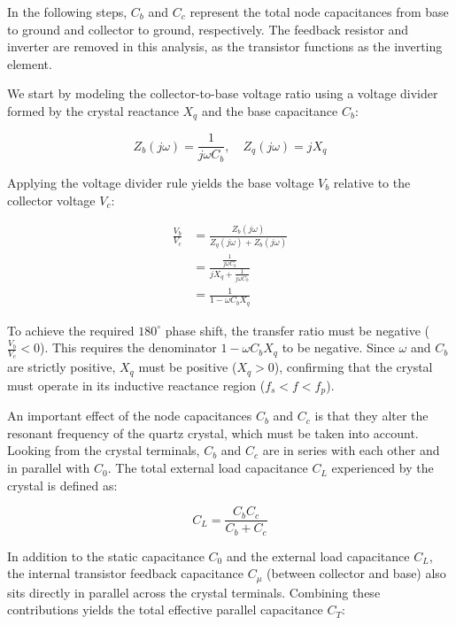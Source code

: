 In the following steps, $C_b$ and $C_c$ represent the total node capacitances from base to ground and collector to ground, respectively. The feedback resistor and inverter are removed in this analysis, as the transistor functions as the inverting element.

We start by modeling the collector-to-base voltage ratio using a voltage divider formed by the crystal reactance $X_q$ and the base capacitance $C_b$:

\begin{equation}
	Z_b(j\omega) = \frac{1}{j\omega C_b}, \quad Z_q(j\omega) = j X_q
\end{equation}

Applying the voltage divider rule yields the base voltage $V_b$ relative to the collector voltage $V_c$:

\begin{align}
	\frac{V_b}{V_c} &= \frac{Z_b(j\omega)}{Z_q(j\omega) + Z_b(j\omega)} \nonumber \\
	&= \frac{\frac{1}{j\omega C_b}}{j X_q + \frac{1}{j\omega C_b}} \nonumber \\
	&= \frac{1}{1 - \omega C_b X_q}
\end{align}

To achieve the required $180^\circ$ phase shift, the transfer ratio must be negative ($\frac{V_b}{V_c} < 0$). This requires the denominator $1 - \omega C_b X_q$ to be negative. Since $\omega$ and $C_b$ are strictly positive, $X_q$ must be positive ($X_q > 0$), confirming that the crystal must operate in its inductive reactance region ($f_s < f < f_p$).

An important effect of the node capacitances $C_b$ and $C_c$ is that they alter the resonant frequency of the quartz crystal, which must be taken into account. Looking from the crystal terminals, $C_b$ and $C_c$ are in series with each other and in parallel with $C_0$. The total external load capacitance $C_L$ experienced by the crystal is defined as:

\begin{equation}
	C_L = \frac{C_b C_c}{C_b + C_c}
\end{equation}

In addition to the static capacitance $C_0$ and the external load capacitance $C_L$, the internal transistor feedback capacitance $C_\mu$ (between collector and base) also sits directly in parallel across the crystal terminals. Combining these contributions yields the total effective parallel capacitance $C_T$:

